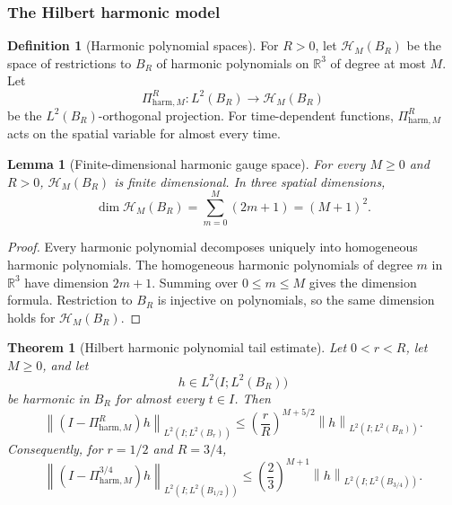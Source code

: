 \documentclass[11pt]{article}
\numberwithin{equation}{section}
\newtheorem{theorem}{Theorem}[section]
\newtheorem{lemma}[lemma]{Lemma}
\theoremstyle{definition}
\newtheorem{definition}[definition]{Definition}
\theoremstyle{remark}
\newcommand{\R}{\mathbb{R}}
\newcommand{\harm}{\mathrm{harm}}
\newcommand{\norm}[2]{\left\|#1\right\|_{#2}}
\newcommand{\calH}{\mathcal H}
\begin{document}
\subsubsection{The Hilbert harmonic model}

\begin{definition}[Harmonic polynomial spaces]\label{def:harmonic-polynomial-space}
For $R>0$, let $\calH_M(B_R)$ be the space of restrictions to $B_R$ of harmonic
polynomials on $\R^3$ of degree at most $M$.  Let
\[
        \Pi^R_{\harm,M}:L^2(B_R)\to \calH_M(B_R)
\]
be the $L^2(B_R)$-orthogonal projection.  For time-dependent functions,
$\Pi^R_{\harm,M}$ acts on the spatial variable for almost every time.
\end{definition}

\begin{lemma}[Finite-dimensional harmonic gauge space]\label{lem:dimension-harmonic-space}
For every $M\ge0$ and $R>0$, $\calH_M(B_R)$ is finite dimensional.  In three spatial
dimensions,
\[
        \dim \calH_M(B_R)=\sum_{m=0}^M(2m+1)=(M+1)^2.
\]
\end{lemma}

\begin{proof}
Every harmonic polynomial decomposes uniquely into homogeneous harmonic polynomials.
The homogeneous harmonic polynomials of degree $m$ in $\R^3$ have dimension $2m+1$.
Summing over $0\le m\le M$ gives the dimension formula.  Restriction to $B_R$ is
injective on polynomials, so the same dimension holds for $\calH_M(B_R)$.
\end{proof}

\begin{theorem}[Hilbert harmonic polynomial tail estimate]\label{thm:L2-harmonic-tail}
Let $0<r<R$, let $M\ge0$, and let
\[
        h\in L^2\bigl(I;L^2(B_R)\bigr)
\]
be harmonic in $B_R$ for almost every $t\in I$.  Then
\begin{equation}\label{eq:L2-harmonic-tail}
\norm{(I-\Pi^R_{\harm,M})h}{L^2(I;L^2(B_r))}
\le
\left(\frac rR\right)^{M+5/2}
\norm{h}{L^2(I;L^2(B_R))}.
\end{equation}
Consequently, for $r=1/2$ and $R=3/4$,
\[
\norm{(I-\Pi^{3/4}_{\harm,M})h}{L^2(I;L^2(B_{1/2}))}
\le
\left(\frac23\right)^{M+1}
\norm{h}{L^2(I;L^2(B_{3/4}))}.
\]
\end{theorem}
\end{document}
